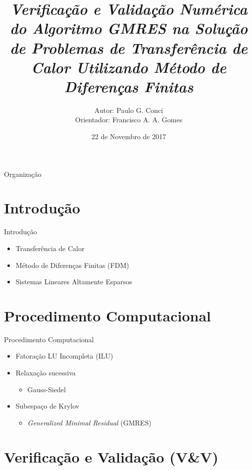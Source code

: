 \documentclass[14pt, aspectratio=169]{beamer}
\title{\textit{Verificação e Validação Numérica do Algoritmo GMRES
  na Solução de Problemas de Transferência de Calor Utilizando Método de
  Diferenças Finitas}}
\author{Autor: Paulo G. Conci \\ Orientador: Francisco A. A. Gomes}
\institute{UTFPR}
\date{22 de Novembro de 2017}
\begin{document}
\begin{frame}[plain]
  \maketitle
\end{frame}

\begin{frame}[plain]{Organização}
    \tableofcontents
\end{frame} 

\section{Introdução}
\begin{frame}{Introdução}
\begin{itemize}
\item Transferência de Calor \\[10pt]
\item Método de Diferenças Finitas (FDM) \\[10pt]
\item Sistemas Lineares Altamente Esparsos
\end{itemize}
\end{frame}

\section{Procedimento Computacional} 
\begin{frame}{Procedimento Computacional}
\begin{itemize}
    \item Fatoração LU Incompleta (ILU)\\[10pt]
    \item Relaxação sucessiva
        \begin{itemize}
        \item Gauss-Siedel
        \end{itemize}
    \item Subespaço de Krylov
        \begin{itemize}
        \item \textit{Generalized Minimal Residual} (GMRES)\\[10pt]
        \end{itemize}
\end{itemize}
\end{frame}

\section{Verificação e Validação (V\&V)}
\end{document}
